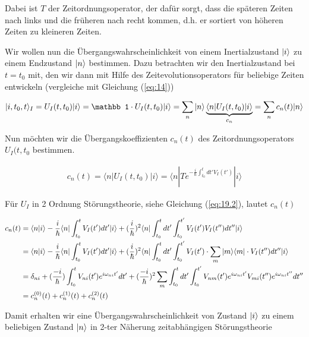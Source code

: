 Dabei ist \(T\) der Zeitordnungsoperator, der dafür sorgt, dass die späteren Zeiten nach links und die früheren nach recht kommen, d.h. er sortiert von höheren Zeiten zu kleineren Zeiten.

Wir wollen nun die Übergangswahrscheinlichkeit von einem Inertialzustand \(\left| i \right\rangle\) zu einem Endzustand \(\left| n \right\rangle\) bestimmen. Dazu betrachten wir den Inertialzustand bei \(t=t_0\) mit, den wir dann mit Hilfe des Zeitevolutionsoperators für beliebige Zeiten entwickeln (vergleiche mit Gleichung (\ref{eq:14}))

\begin{align}
  \label{eq:23}
  |i,t_0,t\rangle_I = U_I(t,t_0)|i\rangle = \mathbb 1\cdot U_I(t,t_0)|i\rangle = \sum_n |n\rangle \underbr{\langle n| U_I(t,t_0)|i\rangle}_{c_n} = \sum_n c_n(t) |n\rangle
\end{align}

Nun möchten wir die Übergangskoeffizienten \(c_n(t)\) des Zeitordnungsoperators \(U_I(t,t_0\) bestimmen.

\begin{align}
  \label{eq:24}
  c_n(t) = \langle n|U_I(t,t_0)|i\rangle = \langle n | Te^{-\frac{i}{\hbar}\int_{t_0}^tdt'V_I(t')}|i\rangle
\end{align}

Für \(U_I\) in 2 Ordnung Störungstheorie, siehe Gleichung (\ref{eq:19.2}), lautet \(c_n(t)\)

\begin{align}
  \label{eq:21}
   c_n(t) &= \langle n|i\rangle - \frac{i}{\hbar}\langle n |\int_{t_0}^t V_I(t')dt'|i\rangle + (\frac{i}{\hbar})^2\langle n |\int_{t_0}^t dt'\int_{t_0}^{t'} V_I(t')V_I(t'')dt'' |i\rangle \notag \\
 &= \langle n|i\rangle - \frac{i}{\hbar}\langle n |\int_{t_0}^t V_I(t')dt'|i\rangle + (\frac{i}{\hbar})^2\langle n |\int_{t_0}^t dt'\int_{t_0}^{t'} V_I(t')\cdot\sum_m |m\rangle \langle m|\cdot V_I(t'')dt'' |i\rangle\notag \\
&= \delta_{ni}+(\frac{-i}{\hbar})\int_{t_0}^t V_{ni}(t')e^{i\omega_{ni}t'}dt' + (\frac{-i}{\hbar})^2\sum_m\int_{t_0}^tdt'\int_{t_0}^{t'} V_{nm}(t')e^{i\omega_{ni}t'} V_{mi}(t'')e^{i\omega_{ni}t''} dt''\notag \\
&= c_n^{(0)}(t)+c_n^{(1)}(t)+c_n^{(2)}(t)
\end{align}

Damit erhalten wir eine Übergangswahrscheinlichkeit von Zustand \(\left| i \right\rangle\) zu einem beliebigen Zustand \(\left| n \right\rangle\) in 2-ter Näherung zeitabhängigen Störungstheorie

